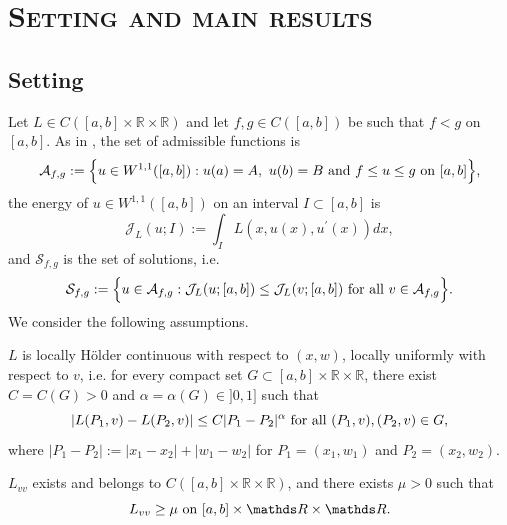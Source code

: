 \documentclass[reqno,12pt]{amsart}
\numberwithin{equation}{section}
\def\RR{{\mathds R}}
\def\J{\mathcal{J}_L}
\def\A{\mathcal{A}_{f,g}}
\def\Sol{\mathcal{S}_{f,g}}
\theoremstyle{remark}
\begin{document}
\section{\textsc{\textsf{Setting and main results}}}\label{Sect-Main-Results}

\subsection{Setting}\label{Subsect-setting} Let $L\in C([a,b]\times\RR\times\RR)$ and let $f,g\in C([a,b])$ be such that $f<g$ on $[a,b]$. As in \cite{mandallena18}, the set of admissible functions is
\begin{equation*}
\A:=\Big\{u\in W^{1,1}([a,b]):u(a)=A,\ u(b)=B\hbox{ and }f\leq u\leq g\hbox{ on }[a,b]\Big\},
\end{equation*}
the energy of $u\in W^{1,1}([a,b])$ on an interval $I\subset[a,b]$ is
\begin{equation*}
\J(u;I):=\int_I L(x,u(x),u^\prime(x))dx,
\end{equation*}
and $\Sol$ is the set of solutions, i.e. 
\begin{equation*}
\Sol:=\Big\{u\in\A:\J(u;[a,b])\leq\J(v;[a,b])\hbox{ for all }v\in\A\Big\}.
\end{equation*}
We consider the following assumptions.
\begin{HypH}[itemsep=0.8em, topsep=0.6em]
\item\label{HypH1} $L$ is locally H\"older continuous with respect to $(x,w)$, locally uniformly with respect to $v$, i.e. for every compact set $G\subset[a,b]\times\RR\times\RR$, there exist $C=C(G)>0$ and $\alpha=\alpha(G)\in]0,1]$ such that
\begin{equation*}
|L(P_1,v)-L(P_2,v)|\leq C|P_1-P_2|^\alpha\hbox{ for all }(P_1,v),(P_2,v)\in G,
\end{equation*}
where $|P_1-P_2|:=|x_1-x_2|+|w_1-w_2|$ for $P_1=(x_1,w_1)$ and $P_2=(x_2,w_2)$.
\item\label{HypH2} $L_{vv}$ exists and belongs to $C([a,b]\times\RR\times\RR)$, and there exists $\mu>0$ such that 
\begin{equation*}
L_{vv}\geq\mu\hbox{ on }[a,b]\times\RR\times\RR.
\end{equation*}
\end{HypH}
\end{document}
